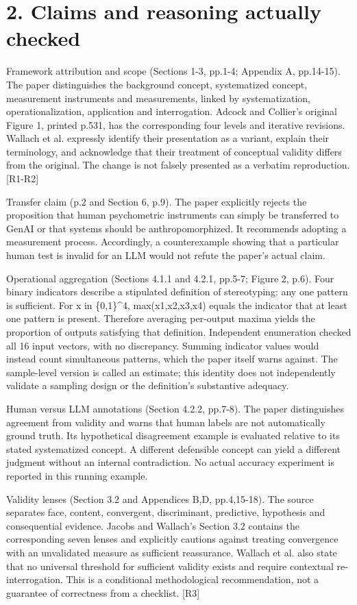 \documentclass[10pt]{article}
\begin{document}
\section*{2. Claims and reasoning actually checked}
Framework attribution and scope (Sections 1-3, pp.1-4; Appendix A, pp.14-15). The paper distinguishes the background concept, systematized concept, measurement instruments and measurements, linked by systematization, operationalization, application and interrogation. Adcock and Collier’s original Figure 1, printed p.531, has the corresponding four levels and iterative revisions. Wallach et al. expressly identify their presentation as a variant, explain their terminology, and acknowledge that their treatment of conceptual validity differs from the original. The change is not falsely presented as a verbatim reproduction. [R1-R2]\par
Transfer claim (p.2 and Section 6, p.9). The paper explicitly rejects the proposition that human psychometric instruments can simply be transferred to GenAI or that systems should be anthropomorphized. It recommends adopting a measurement process. Accordingly, a counterexample showing that a particular human test is invalid for an LLM would not refute the paper’s actual claim.\par
Operational aggregation (Sections 4.1.1 and 4.2.1, pp.5-7; Figure 2, p.6). Four binary indicators describe a stipulated definition of stereotyping: any one pattern is sufficient. For x in \{0,1\}\textasciicircum{}4, max(x1,x2,x3,x4) equals the indicator that at least one pattern is present. Therefore averaging per-output maxima yields the proportion of outputs satisfying that definition. Independent enumeration checked all 16 input vectors, with no discrepancy. Summing indicator values would instead count simultaneous patterns, which the paper itself warns against. The sample-level version is called an estimate; this identity does not independently validate a sampling design or the definition’s substantive adequacy.\par
Human versus LLM annotations (Section 4.2.2, pp.7-8). The paper distinguishes agreement from validity and warns that human labels are not automatically ground truth. Its hypothetical disagreement example is evaluated relative to its stated systematized concept. A different defensible concept can yield a different judgment without an internal contradiction. No actual accuracy experiment is reported in this running example.\par
Validity lenses (Section 3.2 and Appendices B,D, pp.4,15-18). The source separates face, content, convergent, discriminant, predictive, hypothesis and consequential evidence. Jacobs and Wallach’s Section 3.2 contains the corresponding seven lenses and explicitly cautions against treating convergence with an unvalidated measure as sufficient reassurance. Wallach et al. also state that no universal threshold for sufficient validity exists and require contextual re-interrogation. This is a conditional methodological recommendation, not a guarantee of correctness from a checklist. [R3]\par
\end{document}
